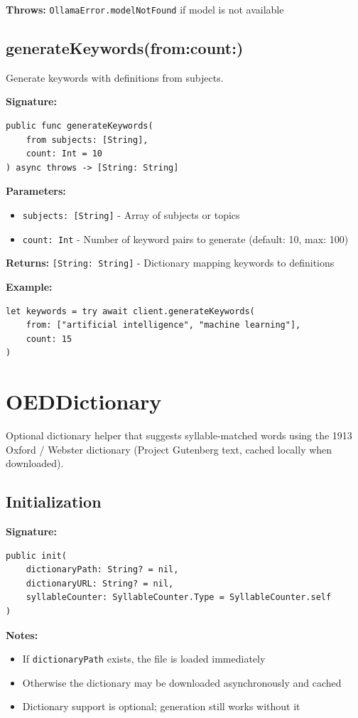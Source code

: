 \documentclass[11pt,a4paper]{article}
\begin{document}
\textbf{Throws:} \texttt{OllamaError.modelNotFound} if model is not available

\subsection{generateKeywords(from:count:)}

Generate keywords with definitions from subjects.

\textbf{Signature:}
\begin{lstlisting}
public func generateKeywords(
    from subjects: [String],
    count: Int = 10
) async throws -> [String: String]
\end{lstlisting}

\textbf{Parameters:}
\begin{itemize}
    \item \texttt{subjects: [String]} - Array of subjects or topics
    \item \texttt{count: Int} - Number of keyword pairs to generate (default: 10, max: 100)
\end{itemize}

\textbf{Returns:} \texttt{[String: String]} - Dictionary mapping keywords to definitions

\textbf{Example:}
\begin{lstlisting}
let keywords = try await client.generateKeywords(
    from: ["artificial intelligence", "machine learning"],
    count: 15
)
\end{lstlisting}

\section{OEDDictionary}

Optional dictionary helper that suggests syllable-matched words using the 1913 Oxford / Webster dictionary (Project Gutenberg text, cached locally when downloaded).

\subsection{Initialization}

\textbf{Signature:}
\begin{lstlisting}
public init(
    dictionaryPath: String? = nil,
    dictionaryURL: String? = nil,
    syllableCounter: SyllableCounter.Type = SyllableCounter.self
)
\end{lstlisting}

\textbf{Notes:}
\begin{itemize}
    \item If \texttt{dictionaryPath} exists, the file is loaded immediately
    \item Otherwise the dictionary may be downloaded asynchronously and cached
    \item Dictionary support is optional; generation still works without it
\end{itemize}
\end{document}
